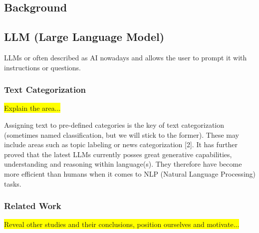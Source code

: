 \documentclass{article}
\begin{document}
\subsection{Background}







\subsection{LLM (Large Language Model)}

LLMs or often described as AI nowadays and allows the user to prompt it with instructions or questions.

\subsubsection{Text Categorization}
\colorbox{yellow}{Explain the area...}

Assigning text to pre-defined categories is the key of text categorization
(sometimes named classification, but we will stick to the former).
These may include areas such as topic labeling or news categorization [2].
It has further proved that the latest LLMs currently posses great generative capabilities, understanding
and reasoning within language(s).
They therefore have become more efficient than humans when it comes to NLP (Natural Language Processing)
tasks.

\subsubsection{Related Work}
\colorbox{yellow}{Reveal other studies and their conclusions, position ourselves and motivate...}
\end{document}
